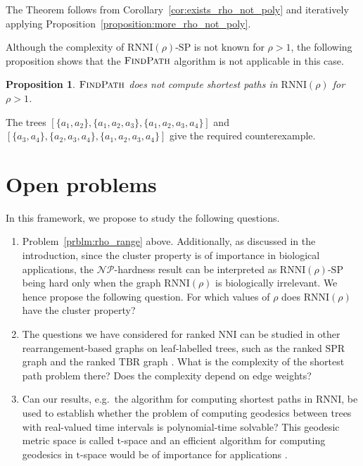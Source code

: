 \documentclass[11pt]{amsart}
\newtheorem{proposition}{Proposition}
\newcommand{\rnni}{\mathrm{RNNI}}
\newcommand{\findpath}{\textsc{FindPath}}
\newcommand{\nni}{\mathrm{NNI}}
\newcommand{\spr}{\mathrm{SPR}}
\newcommand{\tbr}{\mathrm{TBR}}
\newcommand{\np}{\mathcal{NP}}
\newcommand{\decprob}[1]{\rnni(#1)\text{-}\mathrm{SP}}
\begin{document}
\proof
    The Theorem follows from Corollary~\ref{cor:exists_rho_not_poly} and iteratively applying Proposition~\ref{proposition:more_rho_not_poly}.
\endproof

Although the complexity of $\decprob{\rho}$ is not known for $\rho > 1$, the following proposition shows that the $\findpath$ algorithm is not applicable in this case.

\begin{proposition}
$\findpath$ does not compute shortest paths in $\rnni(\rho)$ for $\rho > 1$.
\label{prop:complexity_above_rnni}
\end{proposition}

\proof
The trees $[\{a_1,a_2\},\{a_1,a_2,a_3\},\{a_1,a_2,a_3,a_4\}]$ and $[\{a_3,a_4\},\{a_2,a_3,a_4\},\{a_1,a_2,a_3,a_4\}]$ give the required counterexample.
\endproof


\section{Open problems}

In this framework, we propose to study the following questions.
\begin{enumerate}
\item Problem~\ref{prblm:rho_range} above.
Additionally, as discussed in the introduction, since the cluster property is of importance in biological applications, the $\np$-hardness result can be interpreted as $\decprob{\rho}$ being hard only when the graph $\rnni(\rho)$ is biologically irrelevant.
We hence propose the following question.
For which values of $\rho$ does $\rnni(\rho)$ have the cluster property?


\item The questions we have considered for ranked $\nni$ can be studied in other rearrangement-based graphs on leaf-labelled trees, such as the ranked $\spr$ graph and the ranked $\tbr$ graph \autocite{Semple2003-nj}.
What is the complexity of the shortest path problem there?
Does the complexity depend on edge weights?

\item Can our results, e.g.\ the algorithm for computing shortest paths in $\rnni$, be used to establish whether the problem of computing geodesics between trees with real-valued time intervals is polynomial-time solvable?
This geodesic metric space is called $\mathrm t$-space and an efficient algorithm for computing geodesics in $\mathrm t$-space would be of importance for applications \autocite{Gavryushkin2016-uu}.
\end{enumerate}
\end{document}

